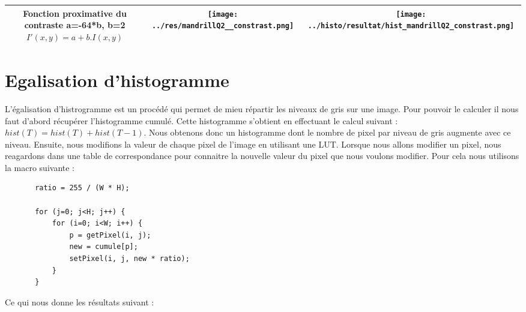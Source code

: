 \documentclass[a4paper,11pt]{article}
\begin{document}
\begin{tabular}{|c|c|c|}
    \hline
    \shortstack{Fonction proximative du contraste \\ a=-64*b, b=2 \\ $I'(x,y)=a+b.I(x,y)$} & \texttt{[image: ../res/mandrillQ2\_\_constrast.png]} & \texttt{[image: ../histo/resultat/hist\_mandrillQ2\_constrast.png]}\\
    \hline
  \end{tabular}
  
  
  \section{Egalisation d'histogramme}
  L'égalisation d'histrogramme est un procédé qui permet de mieu répartir les niveaux de gris sur une image.
  Pour pouvoir le calculer il nous faut d'abord récupérer l'histogramme cumulé. 
  Cette histogramme s'obtient en effectuant le calcul suivant : $hist(T)=hist(T)+hist(T-1)$. Nous obtenons donc
  un histogramme dont le nombre de pixel par niveau de gris augmente avec ce niveau. Ensuite, nous modifions la valeur de chaque pixel
  de l'image en utilisant une LUT. Lorsque nous allons modifier un pixel, nous reagardons dans une table de correspondance pour 
  connaitre la nouvelle valeur du pixel que nous voulons modifier. Pour cela nous utilisons la macro suivante :
  
  \begin{lstlisting}
       ratio = 255 / (W * H);

       for (j=0; j<H; j++) {
           for (i=0; i<W; i++) {
               p = getPixel(i, j);
               new = cumule[p];
               setPixel(i, j, new * ratio);
           }
       }
  \end{lstlisting}

  Ce qui nous donne les résultats suivant : \\
  
\end{document}
